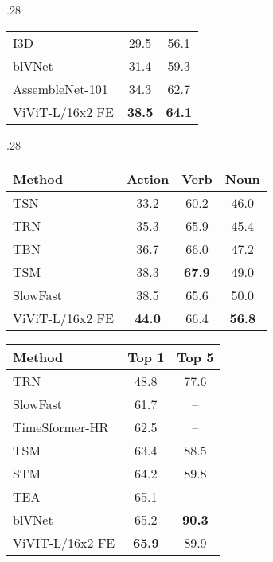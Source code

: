 \documentclass[10pt,twocolumn,letterpaper]{article}
\begin{document}
\begin{table*}[tb]
\begin{subtable}[t]{.28\linewidth}
{\begin{tabular}{lcc}
  				I3D~\cite{carreira_cvpr_2017}					& 29.5		&  56.1		\\
  				blVNet~\cite{fan_blvnet_neurips_2019}	 &  31.4	 &  59.3 	 \\
  				AssembleNet-101~\cite{ryoo_iclr_2020} 	&  34.3     &  62.7     \\
  				\midrule
  				ViViT-L/16x2 FE 	& \textbf{38.5} & \textbf{64.1} \\  \bottomrule
  			\end{tabular}
  			\label{tab:sota_moments_in_time}
  		}
  	\end{subtable}
  	\hfill
  	\begin{subtable}[t]{.28\linewidth}
  		\caption{Epic Kitchens 100 Top 1 accuracy}
  		\setlength{\tabcolsep}{4pt} \vspace{-0.3\baselineskip}
		\scriptsize{
			\begin{tabular}{lccc}
				\toprule
				Method 													 & Action & Verb  & Noun  \\
				\midrule
				TSN~\cite{wang_tsn_eccv_2016}		 		&  33.2 & 60.2 & 46.0  \\
				TRN~\cite{zhou_trn_eccv_2018} 				& 35.3 & 65.9 & 45.4   \\
				TBN~\cite{kazakos_iccv_2019}				 & 36.7 & 66.0 & 47.2    \\
				TSM~\cite{lin_tsm_cvpr_2019} 				 & 38.3 & \textbf{67.9} & 49.0  \\
				SlowFast~\cite{feichtenhofer_iccv_2019}  & 38.5 & 65.6 & 50.0  \\
				\midrule
				ViViT-L/16x2 FE & \textbf{44.0} & 66.4 & \textbf{56.8} \\ \bottomrule
			\end{tabular}
		}
		\label{tab:sota_epic_kitchens}
		\vspace{0.4\baselineskip}
		\centering
		\caption{Something-Something v2}
		\setlength{\tabcolsep}{6pt} \scriptsize{
			\begin{tabular}{lcc}
				\toprule
				Method 												  & Top 1                & Top 5   \\
				\midrule
				TRN~\cite{zhou_trn_eccv_2018}										& 48.8 & 77.6 \\
				SlowFast~\cite{feichtenhofer_cvpr_2020,wu_multigrid_cvpr_2020}		& 61.7 & --    \\
				TimeSformer-HR~\cite{bertasius_arxiv_2021}					& 62.5 & -- \\
				TSM~\cite{lin_tsm_cvpr_2019}    		   							& 63.4 & 88.5 \\
				STM~\cite{jiang_stm_iccv_2019}				   						& 64.2 & 89.8 \\
				TEA~\cite{li_tea_cvpr_2020}						   					& 65.1 & -- \\
				blVNet~\cite{fan_blvnet_neurips_2019}  		 						& 65.2  & \textbf{90.3} \\
				\midrule
				ViVIT-L/16x2 FE		& \textbf{65.9}  & 89.9 \\ \bottomrule
			\end{tabular}
			\label{tab:sota_ssv2}
		}
	\end{subtable}
	\vspace{-\baselineskip}
\end{table*}
\end{document}
